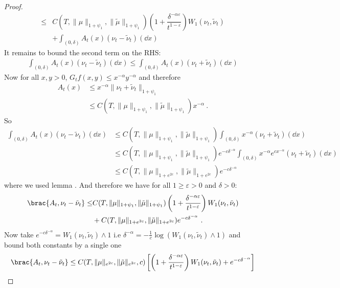 \begin{proof}
\begin{align*}
        \leq&C(T,\|\mu\|_{1 + \psi_1},\|\tilde{\mu}\|_{1 + \psi_1})\left( 1 + \dfrac{\delta^{-\alpha\varepsilon}}{t^{1 - \varepsilon}}\right) W_1(\nu_t,\tilde{\nu}_t)\\ &+ \int_{(0,\delta)} A_t(x) (\nu_t - \tilde{\nu}_t)(\dd x)
    \end{align*}
    It remains to bound the second term on the RHS:
    \begin{align*}
        \int_{(0,\delta)} A_t(x) (\nu_t - \tilde{\nu}_t)(\dd x) \leq \int_{(0,\delta)} A_t(x) (\nu_t + \tilde{\nu}_t)(\dd x)
    \end{align*}
    Now for all $x ,y> 0$, $G_tf(x,y) \leq x^ {-\alpha} y^{-\alpha}$ and therefore
    \begin{align*}
        A_t(x) &\leq  x^{-\alpha}\| \nu_t +\tilde{\nu}_t\|_{1 + \psi_1} \\
        &\leq C(T,\|\mu\|_{1 + \psi_1},\|\tilde{\mu}\|_{1 + \psi_1}) x^{-\alpha}\ .
    \end{align*}
    So
    \begin{align*}
        \int_{(0,\delta)} A_t(x) (\nu_t - \tilde{\nu}_t)(\dd x) &\leq C(T,\|\mu\|_{1 + \psi_1},\|\tilde{\mu}\|_{1 + \psi_1})\int_{(0,\delta)} x^{-\alpha} (\nu_t + \tilde{\nu}_t)(\dd x) \\
        &\leq C(T,\|\mu\|_{1 + \psi_1},\|\tilde{\mu}\|_{1 + \psi_1})e^{- c \delta^{-\alpha}}\int_{(0,\delta)} x^{-\alpha}e^{ c x^{-\alpha}} (\nu_t + \tilde{\nu}_t)(\dd x) \\
        &\leq C(T,\|\mu\|_{1 + e^{2c}},\|\tilde{\mu}\|_{1 + e^{2c}})e^{- c \delta^{-\alpha}}
    \end{align*}
    where we used lemma . And therefore we have for all $1 \geq \varepsilon >  0$ and $\delta > 0$:
    \begin{align*}
        \brac{A_t,\nu_t - \tilde{\nu}_t} \leq& C(T,\|\mu\|_{1 + \psi_1},\|\tilde{\mu}\|_{1 + \psi_1})\left( 1 + \dfrac{\delta^{-\alpha\varepsilon}}{t^{1 - \varepsilon}}\right) W_1(\nu_t,\tilde{\nu}_t) \\
        &+ C(T,\|\mu\|_{1 + e^{2c}},\|\tilde{\mu}\|_{1 + e^{2c}})e^{- c \delta^{-\alpha}}\ .
    \end{align*}
    Now take $e^{- c \delta^{-\alpha}} = W_1(\nu_t,\tilde{\nu}_t)\wedge 1$ i.e $\delta^{-\alpha} = -\frac{1}{c}\log(W_1(\nu_t,\tilde{\nu}_t)\wedge 1)$ and bound both constants by a single one
    \begin{align*}
        \brac{A_t,\nu_t - \tilde{\nu}_t} &\leq C(T,\|\mu\|_{e^{2c}},\|\tilde{\mu}\|_{e^{2c}},c)\left[\left( 1 + \dfrac{\delta^{-\alpha\varepsilon}}{t^{1 - \varepsilon}}\right) W_1(\nu_t,\tilde{\nu}_t) + e^{- c \delta^{-\alpha}}\right] \\

\end{align*}
\end{proof}
